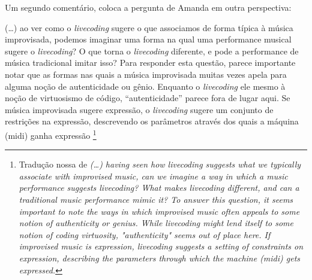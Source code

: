 Um segundo comentário, coloca a pergunta de Amanda em outra perspectiva:

\begin{citacao}
(\ldots) ao ver como o \emph{livecoding} sugere o que associamos de forma típica à música improvisada, podemos imaginar uma forma na qual uma performance musical sugere o \emph{livecoding}? O que torna o \emph{livecoding} diferente, e pode a performance de música tradicional imitar isso? Para responder esta questão, parece importante notar que as formas nas quais a música improvisada muitas vezes apela para alguma noção de autenticidade ou gênio. Enquanto o \emph{livecoding} ele mesmo à noção de virtuosismo de código, ``autenticidade'' parece fora de lugar aqui. Se música improvisada sugere expressão, o \emph{livecoding} sugere um conjunto de restrições na expressão, descrevendo os parâmetros através dos quais a máquina (midi) ganha expressão \footnote{Tradução nossa de \emph{(\ldots) having seen how livecoding suggests what we typically associate with improvised music, can we imagine a way in which a music performance suggests livecoding? What makes livecoding different, and can a traditional music performance mimic it? To answer this question, it seems important to note the ways in which improvised music often appeals to some notion of authenticity or genius. While livecoding might lend itself to some notion of coding virtuosity, "authenticity" seems out of place here. If improvised music is expression, livecoding suggests a setting of constraints on expression, describing the parameters through which the machine (midi) gets expressed.}}
\end{citacao}